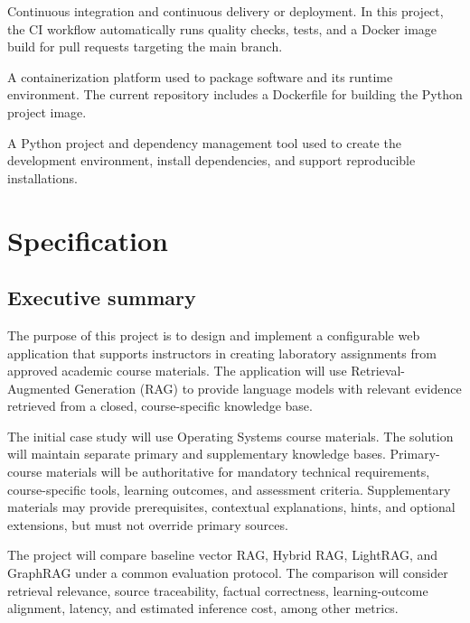 \documentclass[12pt,a4paper]{article}
\begin{document}
\begin{description}[style=nextline]
\item[CI/CD]
Continuous integration and continuous delivery or deployment.
In this project, the CI workflow automatically runs quality
checks, tests, and a Docker image build for pull requests
targeting the main branch.

\item[Docker]
A containerization platform used to package software and its
runtime environment. The current repository includes a Dockerfile
for building the Python project image.

\item[uv]
A Python project and dependency management tool used to create
the development environment, install dependencies, and support
reproducible installations.

\end{description}

\clearpage

\section{Specification}
\label{sec:specification}

\subsection{Executive summary}
\label{sec:executive-summary}

The purpose of this project is to design and implement a
configurable web application that supports instructors in creating
laboratory assignments from approved academic course materials.
The application will use Retrieval-Augmented Generation (RAG)
to provide language models with relevant evidence retrieved from
a closed, course-specific knowledge base.

The initial case study will use Operating Systems course materials.
The solution will maintain separate primary and supplementary
knowledge bases. Primary-course materials will be authoritative
for mandatory technical requirements, course-specific tools,
learning outcomes, and assessment criteria. Supplementary
materials may provide prerequisites, contextual explanations,
hints, and optional extensions, but must not override primary
sources.

The project will compare baseline vector RAG, Hybrid RAG,
LightRAG, and GraphRAG under a common evaluation protocol.
The comparison will consider retrieval relevance, source
traceability, factual correctness, learning-outcome alignment,
latency, and estimated inference cost, among other metrics.
\end{document}
